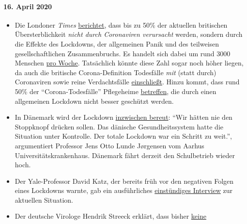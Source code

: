\hypertarget{16-april-2020}{%
\paragraph{16. April 2020}\label{16-april-2020}}

\begin{itemize}
\tightlist
\item
  Die Londoner \emph{Times}
  \href{https://www.thetimes.co.uk/edition/news/coronavirus-record-weekly-death-toll-as-fearful-patients-avoid-hospitals-bm73s2tw3}{berichtet},
  dass bis zu 50\% der aktuellen britischen Übersterblichkeit
  \emph{nicht durch Coronaviren verursacht} werden, sondern durch die
  Effekte des Lockdowns, der allge­meinen Panik und des teilweisen
  gesellschaftlichen Zusammen­bruchs. Es handelt sich dabei um rund 3000
  Menschen
  \href{https://www.ons.gov.uk/peoplepopulationandcommunity/birthsdeathsandmarriages/deaths/bulletins/deathsregisteredweeklyinenglandandwalesprovisional/weekending3april2020}{pro
  Woche}. Tatsächlich könnte diese Zahl sogar noch höher liegen, da auch
  die britische Corona-Definition Todesfälle \emph{mit} (statt durch)
  Coronaviren sowie reine Verdachtsfälle
  \href{https://www.ons.gov.uk/news/statementsandletters/deathsrelatingtothecoronaviruscovid19}{einschließt}.
  Hinzu kommt, dass rund 50\% der ``Corona-Todesfälle'' Pflegeheime
  \href{https://ltccovid.org/2020/04/12/mortality-associated-with-covid-19-outbreaks-in-care-homes-early-international-evidence/}{betreffen},
  die durch einen allgemeinen Lockdown nicht besser geschützt werden.
\item
  In Dänemark wird der Lockdown
  \href{https://jyllands-posten.dk/debat/breve/ECE12074246/vi-skulle-aldrig-have-trykket-paa-stopknappen/}{inzwischen
  bereut}: ``Wir hätten nie den Stoppknopf drücken sollen. Das dänische
  Gesundheitssystem hatte die Situation unter Kontrolle. Der totale
  Lockdown war ein Schritt zu weit.'', argumentiert Professor Jens Otto
  Lunde Jørgensen vom Aarhus Universitätskrankenhaus. Dänemark fährt
  derzeit den Schulbetrieb wieder hoch.\\
\item
  Der Yale-Professor David Katz, der bereits früh vor den negativen
  Folgen eines Lockdowns warnte, gab ein ausführliches
  \href{https://www.youtube.com/watch?v=VK0Wtjh3HVA}{einstündiges
  Interview} zur aktuellen Situation.
\item
  Der deutsche Virologe Hendrik Streeck erklärt, dass bisher
  \href{https://today.rtl.lu/news/science-and-environment/a/1498185.html}{keine
}
\end{itemize}
